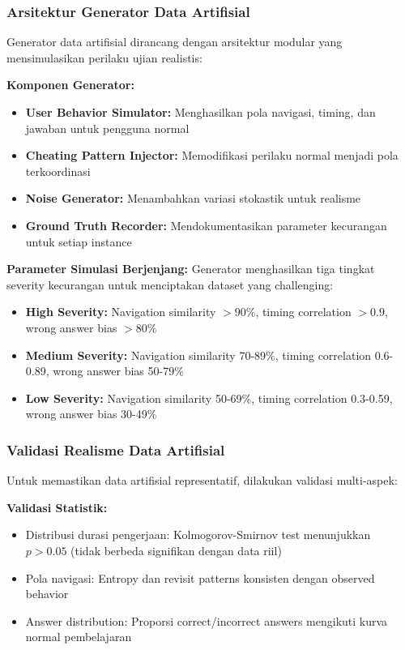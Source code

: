 \subsubsection{Arsitektur Generator Data Artifisial}
\label{sec:arsitekturGenerator}

Generator data artifisial dirancang dengan arsitektur modular yang mensimulasikan perilaku ujian realistis:

\textbf{Komponen Generator:}
\begin{itemize}
    \item \textbf{User Behavior Simulator:} Menghasilkan pola navigasi, timing, dan jawaban untuk pengguna normal
    \item \textbf{Cheating Pattern Injector:} Memodifikasi perilaku normal menjadi pola terkoordinasi
    \item \textbf{Noise Generator:} Menambahkan variasi stokastik untuk realisme
    \item \textbf{Ground Truth Recorder:} Mendokumentasikan parameter kecurangan untuk setiap instance
\end{itemize}

\textbf{Parameter Simulasi Berjenjang:}
Generator menghasilkan tiga tingkat severity kecurangan untuk menciptakan dataset yang challenging:
\begin{itemize}
    \item \textbf{High Severity:} Navigation similarity $>90\%$, timing correlation $>0.9$, wrong answer bias $>80\%$
    \item \textbf{Medium Severity:} Navigation similarity 70-89\%, timing correlation 0.6-0.89, wrong answer bias 50-79\%
    \item \textbf{Low Severity:} Navigation similarity 50-69\%, timing correlation 0.3-0.59, wrong answer bias 30-49\%
\end{itemize}

\subsubsection{Validasi Realisme Data Artifisial}
\label{sec:validasiRealismeArtifisial}

Untuk memastikan data artifisial representatif, dilakukan validasi multi-aspek:

\textbf{Validasi Statistik:}
\begin{itemize}
    \item Distribusi durasi pengerjaan: Kolmogorov-Smirnov test menunjukkan $p>0.05$ (tidak berbeda signifikan dengan data riil)
    \item Pola navigasi: Entropy dan revisit patterns konsisten dengan observed behavior
    \item Answer distribution: Proporsi correct/incorrect answers mengikuti kurva normal pembelajaran
\end{itemize}

